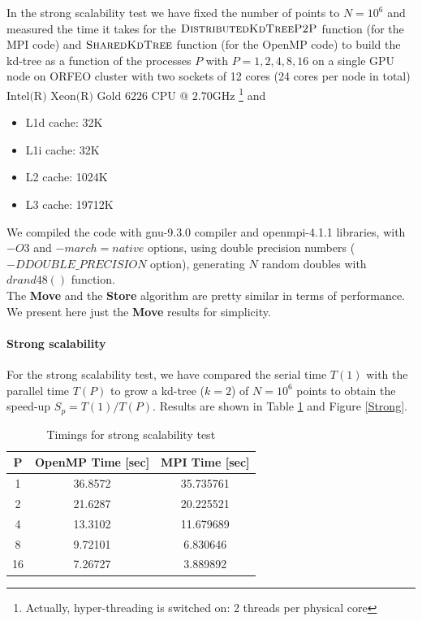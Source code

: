 \documentclass[amssymb, aps,nofootinbib, superscriptaddress, notitlepage]{revtex4}
\begin{document}
In the strong scalability test we have fixed the number of points to $N=10^6$ and measured the time it takes for the $\textsc{DistributedKdTreeP2P}$ function (for the MPI code) and $\textsc{SharedKdTree}$  function (for the OpenMP code) to build the kd-tree as a function of the processes $P$ with $P=1,2,4,8,16$ on a single GPU node on ORFEO cluster with two sockets of 12 cores (24 cores per node in total) $\text{Intel(R) Xeon(R) Gold 6226 CPU @ 2.70GHz}$  \footnote{Actually, hyper-threading is switched on: 2 threads per physical core} and 
\begin{itemize}
\item L1d cache:            32K
\item L1i cache:             32K
\item L2 cache:              1024K
\item L3 cache:              19712K
\end{itemize}
We compiled the code with gnu-9.3.0 compiler and openmpi-4.1.1 libraries, with $-O3$ and $-march=native$ options, using double precision numbers ($-DDOUBLE\_PRECISION$ option), generating $N$ random doubles with $drand48()$ function.
\\
The \textbf{Move} and the \textbf{Store} algorithm are pretty similar in terms of performance. We present here just the \textbf{Move} results for simplicity. 
\paragraph*{Strong scalability}
For the strong scalability test, we have compared the serial time $T(1)$ with the parallel time $T(P)$ to grow a kd-tree ($k=2$) of $N=10^6$ points to obtain the speed-up $S_p=T(1)/T(P)$. Results are shown in Table \ref{table1} and Figure \ref{Strong}.
\begin{table}[h!]
\centering
\begin{tabular}{|c|c|c|}
\hline 
P & OpenMP Time [sec] &  MPI Time [sec] \\ 
\hline 
1 & 36.8572 & 35.735761 \\ 
\hline 
2 & 21.6287  & 20.225521 \\ 
\hline 
4 & 13.3102  & 11.679689 \\ 
\hline 
8 & 9.72101 & 6.830646 \\ 
\hline 
16  & 7.26727 & 3.889892 \\ 
\hline 
\end{tabular} 
\caption{Timings for strong scalability test}
\label{table1}
\end{table}
\end{document}

